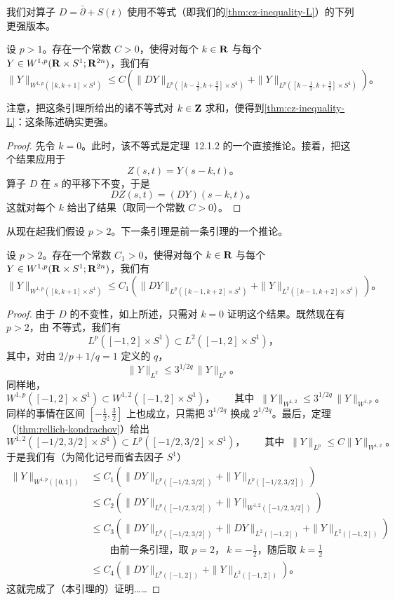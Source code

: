 我们对算子 $D=\bar{\partial}+S(t)$ 使用\trCalderonZygmund{}不等式（即我们的\cref{thm:cz-inequality-L}）的下列更强版本。

\begin{lemma}\label{thm:cz-local-inequality}
设 $p>1$。存在一个常数 $C>0$，使得对每个 $k\in\mathbf{R}$ 与每个 $Y\in W^{1,p}(\mathbf{R}\times S^{1};\mathbf{R}^{2n})$，我们有
\[
\|Y\|_{W^{1,p}([k,k+1]\times S^{1})}\le C\left(\|DY\|_{L^{p}([k-\frac{1}{2},k+\frac{3}{2}]\times S^{1})}+\|Y\|_{L^{p}([k-\frac{1}{2},k+\frac{3}{2}]\times S^{1})}\right)\text{。}
\]
\end{lemma}

注意，把这条引理所给出的诸不等式对 $k\in\mathbf{Z}$ 求和，便得到\cref{thm:cz-inequality-L}：这条陈述确实更强。

\begin{proof}
先令 $k=0$。此时，该不等式是定理~12.1.2 的一个直接推论。接着，把这个结果应用于
\[
Z(s,t)=Y(s-k,t)\text{。}
\]
算子 $D$ 在 $s$ 的平移下不变，于是
\[
DZ(s,t)=(DY)(s-k,t)\text{。}
\]
这就对每个 $k$ 给出了结果（取同一个常数 $C>0$）。
\end{proof}

从现在起我们假设 $p>2$。下一条引理是前一条引理的一个推论。

\begin{lemma}\label{thm:w1p-local-bound}
设 $p>2$。存在一个常数 $C_1>0$，使得对每个 $k\in\mathbf{R}$ 与每个 $Y\in W^{1,p}(\mathbf{R}\times S^{1};\mathbf{R}^{2n})$，我们有
\[
\|Y\|_{W^{1,p}([k,k+1]\times S^{1})}\le C_1\left(\|DY\|_{L^{p}([k-1,k+2]\times S^{1})}+\|Y\|_{L^{2}([k-1,k+2]\times S^{1})}\right)\text{。}
\]
\end{lemma}

\begin{proof}
由于 $D$ 的不变性，如上所述，只需对 $k=0$ 证明这个结果。既然现在有 $p>2$，由 \trHoelder{}不等式，我们有
\[
L^{p}([-1,2]\times S^{1})\subset L^{2}([-1,2]\times S^{1})\text{，}
\]
其中，对由 $2/p+1/q=1$ 定义的 $q$，
\[
\|Y\|_{L^{2}}\le 3^{1/2q}\,\|Y\|_{L^{p}}\text{。}
\]
同样地，
\[
W^{1,p}([-1,2]\times S^{1})\subset W^{1,2}([-1,2]\times S^{1})\text{，}\qquad\text{其中 }\ \|Y\|_{W^{1,2}}\le 3^{1/2q}\,\|Y\|_{W^{1,p}}\text{。}
\]
同样的事情在区间 $[-\frac{1}{2},\frac{3}{2}]$ 上也成立，只需把 $3^{1/2q}$ 换成 $2^{1/2q}$。最后，\trRellich{}定理（\cref{thm:rellich-kondrachov}）给出
\[
W^{1,2}([-1/2,3/2]\times S^{1})\subset L^{p}([-1/2,3/2]\times S^{1})\text{，}\qquad\text{其中 }\ \|Y\|_{L^{p}}\le C\|Y\|_{W^{1,2}}\text{。}
\]
于是我们有（为简化记号而省去因子 $S^{1}$）
\[
\begin{aligned}
\|Y\|_{W^{1,p}([0,1])}
&\le C_1\left(\|DY\|_{L^{p}([-1/2,3/2])}+\|Y\|_{L^{p}([-1/2,3/2])}\right)\\
&\le C_2\left(\|DY\|_{L^{p}([-1/2,3/2])}+\|Y\|_{W^{1,2}([-1/2,3/2])}\right)\\
&\le C_3\left(\|DY\|_{L^{p}([-1/2,3/2])}+\|DY\|_{L^{2}([-1,2])}+\|Y\|_{L^{2}([-1,2])}\right)\\
&\qquad\text{由前一条引理，取 }p=2\text{，}\ k=-\frac{1}{2}\text{，随后取 }k=\frac{1}{2}\\
&\le C_4\left(\|DY\|_{L^{p}([-1,2])}+\|Y\|_{L^{2}([-1,2])}\right)\text{。}
\end{aligned}
\]
这就完成了（本引理的）证明……
\end{proof}


